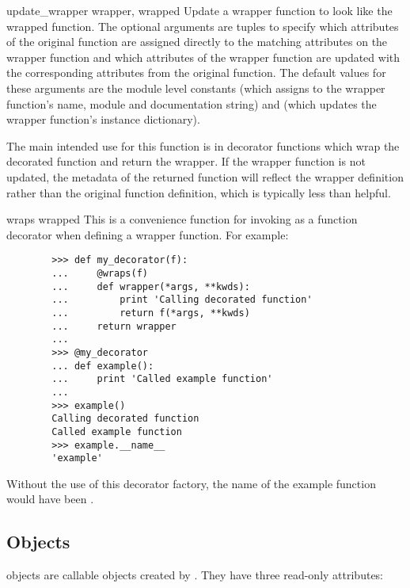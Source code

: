 \begin{funcdesc}{update_wrapper}
{wrapper, wrapped}
Update a wrapper function to look like the wrapped function. The optional
arguments are tuples to specify which attributes of the original
function are assigned directly to the matching attributes on the wrapper
function and which attributes of the wrapper function are updated with
the corresponding attributes from the original function. The default
values for these arguments are the module level constants
 (which assigns to the wrapper function's name,
module and documentation string) and  (which
updates the wrapper function's instance dictionary).

The main intended use for this function is in decorator functions
which wrap the decorated function and return the wrapper. If the
wrapper function is not updated, the metadata of the returned function
will reflect the wrapper definition rather than the original function
definition, which is typically less than helpful.
\end{funcdesc}

\begin{funcdesc}{wraps}
{wrapped}
This is a convenience function for invoking
as a function decorator when defining a wrapper function. For example:
  \begin{verbatim}
        >>> def my_decorator(f):
        ...     @wraps(f)
        ...     def wrapper(*args, **kwds):
        ...         print 'Calling decorated function'
        ...         return f(*args, **kwds)
        ...     return wrapper
        ...
        >>> @my_decorator
        ... def example():
        ...     print 'Called example function'
        ...
        >>> example()
        Calling decorated function
        Called example function
        >>> example.__name__
        'example'
  \end{verbatim}
Without the use of this decorator factory, the name of the example
function would have been .
\end{funcdesc}


\subsection{ Objects \label{partial-objects}}


 objects are callable objects created by .
They have three read-only attributes:

